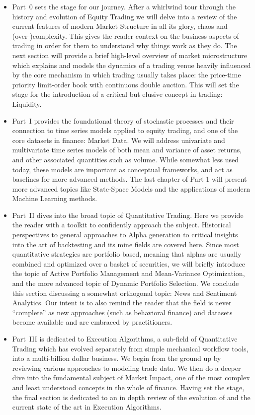 \begin{itemize}
\item Part~0 sets the stage for our journey. After a whirlwind tour through the history and evolution of Equity Trading we will delve into a review of the current features of modern Market Structure in all its glory, chaos and (over-)complexity. This gives the reader context on the business aspects of trading in order for them to understand why things work as they do. The next section will provide a brief high-level overview of market microstructure which explains and models the dynamics of a trading venue  heavily influenced by the core mechanism in which trading usually takes place: the price-time priority limit-order book with continuous double auction. This will set the stage for the introduction of a critical but elusive concept in trading: Liquidity.

\item Part~I provides the foundational theory of stochastic processes and their connection to time series models applied to equity trading, and one of the core datasets in finance: Market Data. We will address univariate and multivariate time series models of both mean and variance of asset returns, and other associated quantities such as volume. While somewhat less used today, these models are important  as conceptual frameworks, and act as baselines for more advanced methods. The last chapter of Part 1 will present more advanced topics like State-Space Models and the applications of modern Machine Learning methods.

\item Part~II dives into the broad topic of Quantitative Trading. Here we provide the reader with a toolkit to confidently approach the subject. Historical perspectives to general approaches to Alpha generation to critical insights into the art of backtesting and its mine fields are covered here. Since most quantitative strategies are portfolio based, meaning that alphas are usually combined  and optimized over a basket of securities, we will briefly introduce the topic of Active Portfolio Management and Mean-Variance Optimization, and the more advanced topic of Dynamic Portfolio Selection. We conclude this section discussing a somewhat orthogonal topic:  News and Sentiment Analytics. Our intent is to also remind the reader that the field is never ``complete'' as new approaches (such as behavioral finance) and datasets become available and are embraced by practitioners.

\item Part~III is dedicated to Execution Algorithms, a sub-field of Quantitative Trading which has evolved separately from simple mechanical workflow tools, into a multi-billion dollar business. We begin from the ground up by reviewing various approaches to modeling trade data. We then do a deeper dive into the fundamental subject of Market Impact, one of the most complex and least understood concepts in the whole of finance. Having set the stage, the final section is dedicated to an in depth review of the evolution of and the current state of the art in Execution Algorithms.


\end{itemize}
